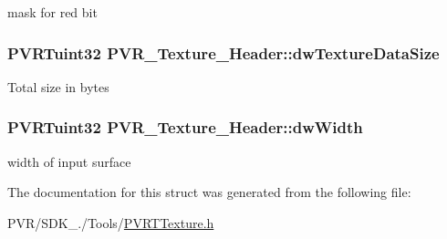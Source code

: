 mask for red bit \hypertarget{struct_p_v_r___texture___header_a4dfcf1a126ee880b9a8fdbbd9214b71a}{
\subsubsection[{dw\+Texture\+Data\+Size}]{\setlength{\rightskip}{0pt plus 5cm}P\+V\+R\+Tuint32 P\+V\+R\+\_\+\+Texture\+\_\+\+Header\+::dw\+Texture\+Data\+Size}}\label{struct_p_v_r___texture___header_a4dfcf1a126ee880b9a8fdbbd9214b71a}
Total size in bytes \hypertarget{struct_p_v_r___texture___header_af50d1792b2bb0c6e78d827644ef44aad}{
\subsubsection[{dw\+Width}]{\setlength{\rightskip}{0pt plus 5cm}P\+V\+R\+Tuint32 P\+V\+R\+\_\+\+Texture\+\_\+\+Header\+::dw\+Width}}\label{struct_p_v_r___texture___header_af50d1792b2bb0c6e78d827644ef44aad}
width of input surface 

The documentation for this struct was generated from the following file\+:\begin{DoxyCompactItemize}
\item 
P\+V\+R/\+S\+D\+K\+\_./\+Tools/\hyperlink{_p_v_r_t_texture_8h}{P\+V\+R\+T\+Texture.\+h}\end{DoxyCompactItemize}
